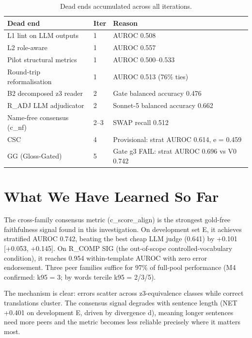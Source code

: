 \documentclass[11pt,letterpaper]{article}
\begin{document}
\begin{table}[!htbp]
\centering
\caption{Dead ends accumulated across all iterations.}
\label{tab:dead_ends_final}
\begin{tabular}{llp{6cm}}
\toprule
Dead end & Iter & Reason \\
\midrule
L1 lint on LLM outputs & 1 & AUROC 0.508 \\
L2 role-aware & 1 & AUROC 0.557 \\
Pilot structural metrics & 1 & AUROC 0.500--0.533 \\
Round-trip reformalisation & 1 & AUROC 0.513 (76\% ties) \\
B2 decomposed z3 reader & 2 & Gate balanced accuracy 0.476 \\
R\_ADJ LLM adjudicator & 2 & Sonnet-5 balanced accuracy 0.662 \\
Name-free consensus (c\_nf) & 2--3 & SWAP recall 0.512 \\
CSC & 4 & Provisional: strat AUROC 0.614, e = 0.459 \\
GG (Gloss-Gated) & 5 & Gate g3 FAIL: strat AUROC 0.696 vs V0 0.742 \\
\bottomrule
\end{tabular}
\end{table}

\section{What We Have Learned So Far}

The cross-family consensus metric (c\_score\_align) is the strongest gold-free faithfulness signal found in this investigation. On development set E, it achieves stratified AUROC 0.742, beating the best cheap LLM judge (0.641) by +0.101 [+0.053, +0.145]. On R\_COMP SIG (the out-of-scope controlled-vocabulary condition), it reaches 0.954 within-template AUROC with zero error endorsement. Three peer families suffice for 97\% of full-pool performance (M4 confirmed: k95 = 3; by words tercile k95 = 2/3/5).

The mechanism is clear: errors scatter across z3-equivalence classes while correct translations cluster. The consensus signal degrades with sentence length (NET +0.401 on development E, driven by divergence d), meaning longer sentences need more peers and the metric becomes less reliable precisely where it matters most.
\end{document}
